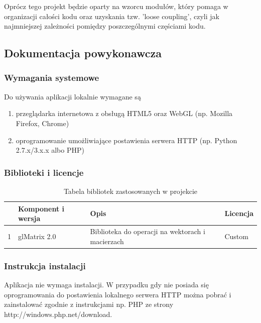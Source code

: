 \documentclass[11pt]{article}
\let\Oldsubsection\subsection
\renewcommand{\subsection}{\FloatBarrier\Oldsubsection}
\let\Oldsubsubsection\subsubsection
\renewcommand{\subsubsection}{\FloatBarrier\Oldsubsubsection}
\begin{document}
Oprócz tego projekt będzie oparty na wzorcu modułów, który pomaga w organizacji całości kodu oraz uzyskania tzw. 'loose coupling', czyli jak najmniejszej zależności pomiędzy poszczególnymi częściami kodu.



\subsection{Dokumentacja powykonawcza}

\subsubsection{Wymagania systemowe}
\par
Do używania aplikacji lokalnie wymagane są
\begin{enumerate}
\item przeglądarka internetowa z obsługą HTML5 oraz WebGL (np. Mozilla Firefox, Chrome)
\item oprogramowanie umożliwiające postawienia serwera HTTP (np. Python 2.7.x/3.x.x albo PHP)
\end{enumerate}
\par

\subsubsection{Biblioteki i licencje}
\begin{table}[!h]
\centering
\caption{Tabela bibliotek zastosowanych w projekcie}
\label{my-label}
\begin{tabularx}{\textwidth}{|X|X|X|X|}
\hline
\rowcolor[HTML]{C0C0C0} 
\multicolumn{1}{|l|}{\cellcolor[HTML]{C0C0C0}Lp} & \multicolumn{1}{l|}{\cellcolor[HTML]{C0C0C0}Komponent i wersja} & \multicolumn{1}{l|}{\cellcolor[HTML]{C0C0C0}Opis}                                & \multicolumn{1}{l|}{\cellcolor[HTML]{C0C0C0}Licencja} \\ \hline
1                                                & glMatrix 2.0& Biblioteka do operacji na wektorach i macierzach                                             & Custom \\\hline 
\end{tabularx}
\end{table}

\subsubsection{Instrukcja instalacji}
\par
Aplikacja nie wymaga instalacji. W przypadku gdy nie posiada się oprogramowania do postawienia lokalnego serwera HTTP można pobrać i zainstalować zgodnie z instrukcjami np. PHP ze strony http://windows.php.net/download.
\end{document}
